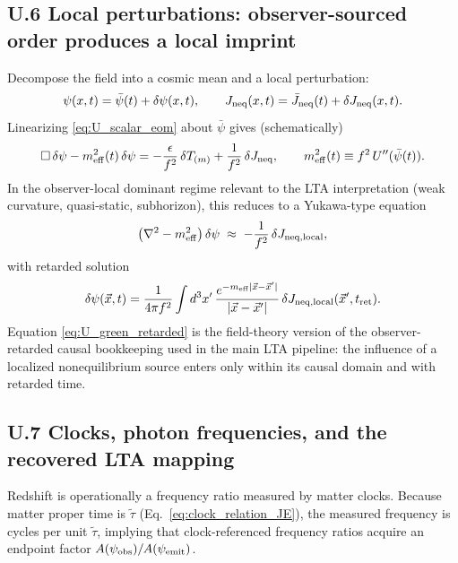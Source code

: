 \documentclass[10pt]{article}
\begin{document}
\subsection{U.6 Local perturbations: observer-sourced order produces a local imprint}
\label{app:unified:local}

Decompose the field into a cosmic mean and a local perturbation:
\begin{equation}
\psi(x,t)=\bar\psi(t)+\delta\psi(x,t),
\qquad
J_{\rm neq}(x,t)=\bar J_{\rm neq}(t)+\delta J_{\rm neq}(x,t).
\label{eq:U_split}
\end{equation}
Linearizing \eqref{eq:U_scalar_eom} about $\bar\psi$ gives (schematically)
\begin{equation}
\Box\,\delta\psi - m_{\rm eff}^2(t)\,\delta\psi
=
-\frac{\epsilon}{f^2}\,\delta T_{(m)} + \frac{1}{f^2}\,\delta J_{\rm neq},
\qquad
m_{\rm eff}^2(t)\equiv f^2\,U''(\bar\psi(t)).
\label{eq:U_perturbation_eq}
\end{equation}
In the observer-local dominant regime relevant to the LTA interpretation (weak curvature, quasi-static, subhorizon),
this reduces to a Yukawa-type equation
\begin{equation}
\left(\nabla^2-m_{\rm eff}^2\right)\delta\psi \;\approx\; -\frac{1}{f^2}\,\delta J_{\rm neq,local},
\label{eq:U_yukawa}
\end{equation}
with retarded solution
\begin{equation}
\delta\psi(\vec x,t)
=
\frac{1}{4\pi f^2}\int d^3x'\,
\frac{e^{-m_{\rm eff}|\vec x-\vec x'|}}{|\vec x-\vec x'|}
\,
\delta J_{\rm neq,local}(\vec x',t_{\rm ret}).
\label{eq:U_green_retarded}
\end{equation}
Equation \eqref{eq:U_green_retarded} is the field-theory version of the observer-retarded causal bookkeeping used in the main LTA pipeline:
the influence of a localized nonequilibrium source enters only within its causal domain and with retarded time.

\subsection{U.7 Clocks, photon frequencies, and the recovered LTA mapping}
\label{app:unified:redshift}

Redshift is operationally a frequency ratio measured by matter clocks. Because matter proper time is $\tilde\tau$
(Eq.~\eqref{eq:clock_relation_JE}), the measured frequency is cycles per unit $\tilde\tau$, implying that
clock-referenced frequency ratios acquire an endpoint factor $A(\psi_{\rm obs})/A(\psi_{\rm emit})$.
\end{document}

